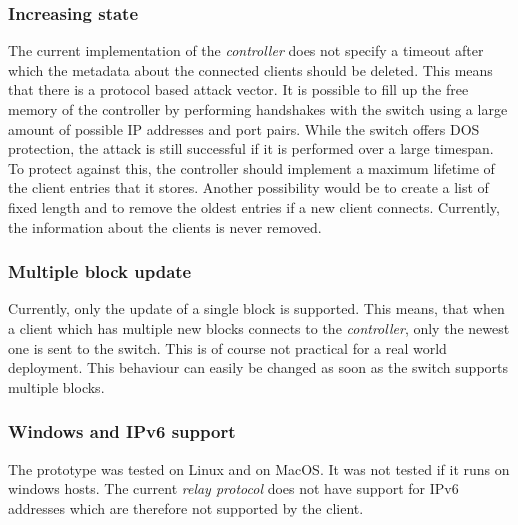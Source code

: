 \subsubsection{Increasing state}
The current implementation of the \textit{controller} does not specify a timeout after which the metadata about the connected clients should be deleted. This means that there is a protocol based attack vector. It is possible to fill up the free memory of the controller by performing handshakes with the switch using a large amount of possible IP addresses and port pairs. While the switch offers DOS protection, the attack is still successful if it is performed over a large timespan. To protect against this, the controller should implement a maximum lifetime of the client entries that it stores. Another possibility would be to create a list of fixed length and to remove the oldest entries if a new client connects. Currently, the information about the clients is never removed.
\subsubsection{Multiple block update}
Currently, only the update of a single block is supported. This means, that when a client which has multiple new blocks connects to the \textit{controller}, only the newest one is sent to the switch. This is of course not practical for a real world deployment. This behaviour can easily be changed as soon as the switch supports multiple blocks.
\subsubsection{Windows and IPv6 support}
The prototype was tested on Linux and on MacOS. It was not tested if it runs on windows hosts. The current \textit{relay protocol} does not have support for IPv6 addresses which are therefore not supported by the client.






























